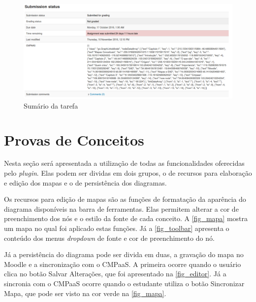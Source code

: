 \documentclass[
	12pt,				%
	openright,			%
	oneside,			%
	a4paper,			%
	english,			%
	french,				%
	spanish,			%
	brazil				%
	]{abntex2}
\begin{document}
\begin{figure}[htb]
	\caption{\label{fig_sumario} Sumário da tarefa}
	\begin{center}
		\includegraphics[scale=0.3]{sumario.png}
	\end{center}
\end{figure}

\section{Provas de Conceitos}

Nesta seção será apresentada a utilização de todas as funcionalidades oferecidas pelo \textit{plugin}. Elas podem ser dividas em dois grupos, o de recursos para elaboração e edição dos mapas e o de persistência dos diagramas.

Os recursos para edição de mapas são as funções de formatação da aparência do diagrama disponíveis na barra de ferramentas. Elas permitem alterar a cor de preenchimento dos nós e o estilo da fonte de cada conceito. A \autoref{fig_mapa} mostra um mapa no qual foi aplicado estas funções. Já a \autoref{fig_toolbar} apresenta o conteúdo dos menus \textit{dropdown} de fonte e cor de preenchimento do nó.

Já a persistência do diagrama pode ser divida em duas, a gravação do mapa no Moodle e a sincronização com o CMPaaS. A primeira ocorre quando o usuário clica no botão Salvar Alterações, que foi apresentado na \autoref{fig_editor}. Já a sincronia com o CMPaaS ocorre quando o estudante utiliza o botão Sincronizar Mapa, que pode ser visto na cor verde na \autoref{fig_mapa}.
\end{document}
